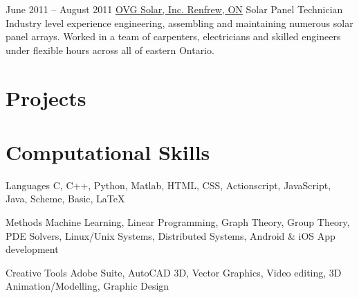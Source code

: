 \documentclass{article}
\begin{document}
\begin{experiencelist}
        \item{
            June 2011 -- August 2011
            }{
                \href{www.ovgsolarinc.ca}{OVG Solar, Inc. Renfrew, ON}
            }{
                Solar Panel Technician
            }{
                Industry level experience engineering, assembling and maintaining numerous solar panel arrays. Worked in a team of carpenters, electricians and skilled engineers under flexible hours across all of eastern Ontario.
            }
    \end{experiencelist}
    \vspace{-20pt}
    \section{Projects}
    \section{Computational Skills}
    \begin{computerlist}
        \item{Languages}
             {C, C++, Python, Matlab, HTML, CSS, Actionscript, JavaScript, Java, Scheme, Basic, LaTeX}
        \item{Methods}
             {Machine Learning, Linear Programming, Graph Theory, Group Theory, PDE Solvers, Linux/Unix Systems, Distributed Systems, Android \& iOS App development}
        \item{Creative Tools}
             {Adobe Suite, AutoCAD 3D, Vector Graphics, Video editing, 3D Animation/Modelling, Graphic Design}
    \end{computerlist}
\end{document}
